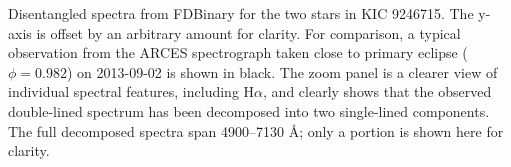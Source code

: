 \label{fig:twospectra} Disentangled spectra from FDBinary for the two stars in KIC 9246715. The y-axis is offset by an arbitrary amount for clarity. For comparison, a typical observation from the ARCES spectrograph taken close to primary eclipse ($\phi = 0.982$) on 2013-09-02 is shown in black. The zoom panel is a clearer view of individual spectral features, including $\textrm{H}\alpha$, and clearly shows that the observed double-lined spectrum has been decomposed into two single-lined components. The full decomposed spectra span 4900--7130 \AA; only a portion is shown here for clarity.
  
  